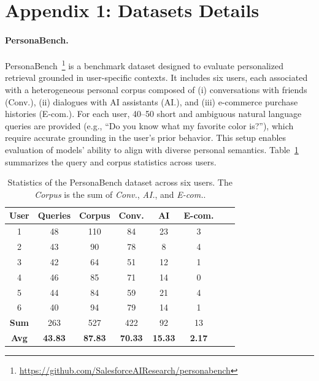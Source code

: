 
\section*{Appendix 1: Datasets Details}

\paragraph{PersonaBench.} 
PersonaBench~\cite{tan2025personabench}\footnote{\url{https://github.com/SalesforceAIResearch/personabench}} is a benchmark dataset designed to evaluate personalized retrieval grounded in user-specific contexts. It includes six users, each associated with a heterogeneous personal corpus composed of (i) conversations with friends (Conv.), (ii) dialogues with AI assistants (AI.), and (iii) e-commerce purchase histories (E-com.). For each user, 40--50 short and ambiguous natural language queries are provided (e.g., ``Do you know what my favorite color is?''), which require accurate grounding in the user’s prior behavior. This setup enables evaluation of models' ability to align with diverse personal semantics. Table~\ref{tab:personabench_stats} summarizes the query and corpus statistics across users.

\begin{table}[htbp]
    \centering
    \begin{tabular}{cccccccc}
    \toprule
    \textbf{User} & \textbf{Queries} & \textbf{Corpus} & \textbf{Conv.} & \textbf{AI} & \textbf{E-com.} \\
    \midrule
    1 & 48 & 110 & 84 & 23 & 3 \\
    2 & 43 & 90  & 78 & 8  & 4 \\
    3 & 42 & 64  & 51 & 12 & 1 \\
    4 & 46 & 85  & 71 & 14 & 0 \\
    5 & 44 & 84  & 59 & 21 & 4 \\
    6 & 40 & 94  & 79 & 14 & 1 \\
    \midrule
    \textbf{Sum} & 263 & 527 & 422 & 92 & 13 \\
    \textbf{Avg} & \textbf{43.83} & \textbf{87.83} & \textbf{70.33} & \textbf{15.33} & \textbf{2.17} \\
    \bottomrule
    \end{tabular}
    \caption{Statistics of the PersonaBench dataset across six users. The \textit{Corpus} is the sum of \textit{Conv.}, \textit{AI.}, and \textit{E-com.}.}
    \label{tab:personabench_stats}
\end{table}


